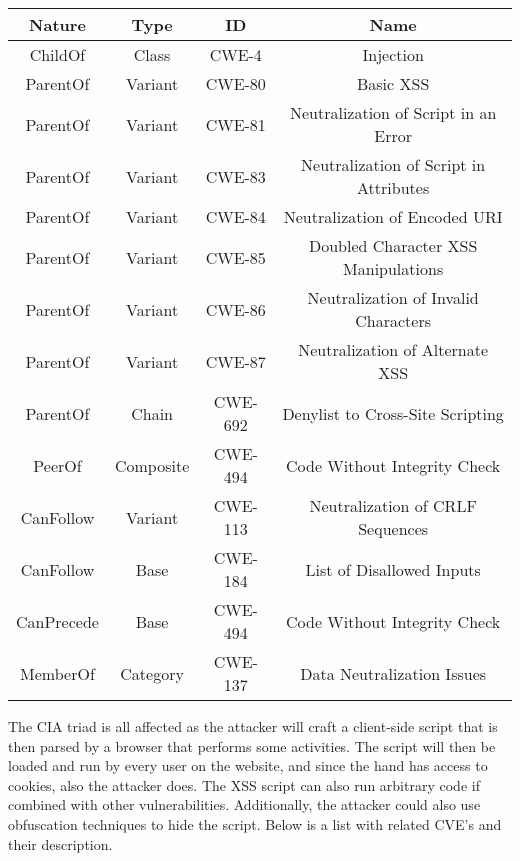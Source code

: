 \begin{table}[H]
  \begin{center}
    \label{tab:lab4-table3}
    \begin{tabular}{c c c c}
      \toprule
      \textbf{Nature} & \textbf{Type} & \textbf{ID} & \textbf{Name} \\
      \midrule
      ChildOf & Class & CWE-4 & Injection\\
      ParentOf & Variant & CWE-80 & Basic XSS\\
      ParentOf & Variant & CWE-81 & Neutralization of Script in an Error\\
      ParentOf & Variant & CWE-83 & Neutralization of Script in Attributes\\
      ParentOf & Variant & CWE-84 & Neutralization of Encoded URI\\
      ParentOf & Variant & CWE-85 & Doubled Character XSS Manipulations\\
      ParentOf & Variant & CWE-86 & Neutralization of Invalid Characters\\
      ParentOf & Variant & CWE-87 & Neutralization of Alternate XSS\\
      ParentOf & Chain & CWE-692 & Denylist to Cross-Site Scripting\\
      PeerOf & Composite & CWE-494 & Code Without Integrity Check\\
      CanFollow & Variant & CWE-113 & Neutralization of CRLF Sequences\\
      CanFollow & Base & CWE-184 & List of Disallowed Inputs\\
      CanPrecede & Base & CWE-494 & Code Without Integrity Check\\
      MemberOf & Category & CWE-137 & Data Neutralization Issues\\
      \bottomrule
    \end{tabular}
  \end{center}
\end{table}

The CIA triad is all affected as the attacker will craft a client-side script
that is then parsed by a browser that performs some activities. The script will
then be loaded and run by every user on the website, and since the hand has
access to cookies, also the attacker does. The XSS script can also run arbitrary
code if combined with other vulnerabilities. Additionally, the attacker could
also use obfuscation techniques to hide the script. Below is a list with related
CVE's and their description.

